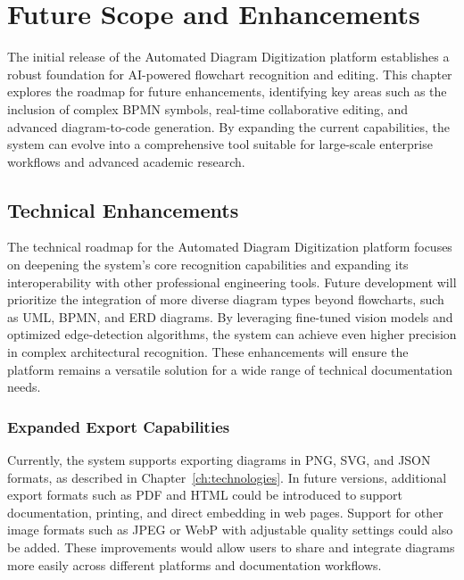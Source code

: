 \chapter{Future Scope and Enhancements}
\label{ch:future}

The initial release of the Automated Diagram Digitization platform 
establishes a robust foundation for AI-powered flowchart recognition 
and editing. This chapter explores the roadmap for future 
enhancements, identifying key areas such as the inclusion of complex 
BPMN symbols, real-time collaborative editing, and advanced 
diagram-to-code generation. By expanding the current capabilities, 
the system can evolve into a comprehensive tool suitable for 
large-scale enterprise workflows and advanced academic 
research.

\section{Technical Enhancements}
\label{sec:tech-enhancements}

The technical roadmap for the Automated Diagram Digitization 
platform focuses on deepening the system's core recognition 
capabilities and expanding its interoperability with other 
professional engineering tools. Future development will prioritize 
the integration of more diverse diagram types beyond flowcharts, 
such as UML, BPMN, and ERD diagrams. By leveraging fine-tuned 
vision models and optimized edge-detection algorithms, the system 
can achieve even higher precision in complex architectural 
recognition. These enhancements will ensure the platform remains 
a versatile solution for a wide range of technical documentation 
needs.~\cite{diagram-recognition}

\subsection{Expanded Export Capabilities}
\label{subsec:export-future}

Currently, the system supports exporting diagrams in PNG, SVG, 
and JSON formats, as described in 
Chapter~\ref{ch:technologies}. In future versions, additional 
export formats such as PDF and HTML could be introduced to 
support documentation, printing, and direct embedding in web 
pages. Support for other image formats such as JPEG or WebP 
with adjustable quality settings could also be added. These 
improvements would allow users to share and integrate diagrams 
more easily across different platforms and documentation 
workflows.~\cite{reactflow}

